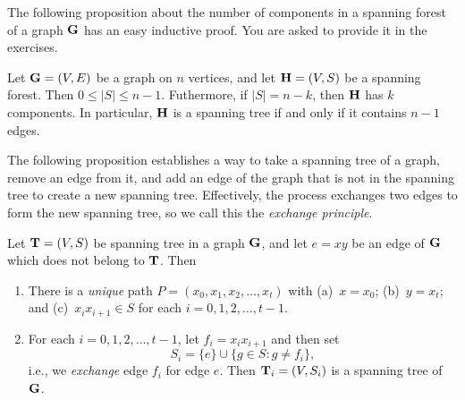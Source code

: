 The following proposition about the number of components in a spanning
forest of a graph $\mathbf{G}$ has an easy inductive proof. You are asked to
provide it in the exercises.

\begin{proposition}\label{prop:graphalgorithms:spanforest}
Let $\mathbf{G}=(V,E)$ be a graph on $n$ vertices, and let $\mathbf{H}=(V,S)$ be
a spanning forest.  Then $0\le |S|\le n-1$.  Futhermore, if
$|S|= n-k$, then $\mathbf{H}$ has $k$ components.  In particular, $\mathbf{H}$ is
a spanning tree if and only if it contains $n-1$ edges.
\end{proposition}

The following proposition establishes a way to take a spanning tree of
a graph, remove an edge from it, and add an edge of the graph that is
not in the spanning tree to create a new spanning tree. Effectively,
the process exchanges two edges to form the new spanning tree, so we
call this the \emph{exchange principle}.

\begin{proposition}\label{prop:graphalgorithms:exchange}
Let $\mathbf{T}=(V,S)$ be spanning tree in a graph $\mathbf{G}$, and let $e=xy$ be
an edge of $\mathbf{G}$ which does not belong to $\mathbf{T}$.  Then
\begin{enumerate}
\item  There is a \emph{unique} path $P=(x_0,x_1,x_2,\dots,x_t)$
with (a)~$x=x_0$; (b)~$y=x_t$; and (c)~$x_ix_{i+1}\in S$ for each
$i=0,1,2,\dots,t-1$.
\item  For each $i=0,1,2,\dots,t-1$, let $f_i=x_ix_{i+1}$ and 
  then set \[S_i = \{e\}\cup\{g\in S: g\neq f_i\},\] i.e., we \emph{exchange}
edge $f_i$ for edge $e$. Then $\mathbf{T}_i=(V,S_i)$ is a spanning tree of $\mathbf{G}$.
\end{enumerate}
\end{proposition}

